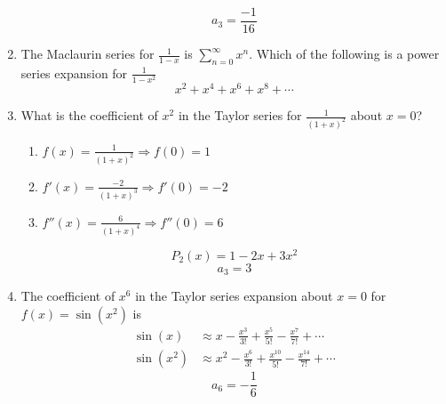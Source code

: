 \documentclass[12pt]{article}
\begin{document}
\begin{enumerate}
	      $$\boxed{a_{3} = \frac{-1}{16}}$$
	\item The Maclaurin series for $\frac{1}{1-x}$ is $\sum_{n=0}^{\infty} x^n$. Which of the following is a power series expansion for $\frac{1}{1-x^2}$
	      $$\boxed{x^2+x^4+x^6+x^8 +\cdots}$$
	\item What is the coefficient of $x^2$ in the Taylor series for $\frac{1}{(1+x)^2}$ about $x = 0$?
	      \begin{enumerate}
	      	\item $f(x) = \frac{1}{(1+x)^2} \Longrightarrow f(0) = 1$
	      	\item $f'(x) = \frac{-2}{(1+x)^3} \Longrightarrow f'(0) = -2$
	      	\item $f''(x) = \frac{6}{(1+x)^4} \Longrightarrow f''(0) = 6$
	      \end{enumerate}
	      $$P_{2}(x) = 1-2x+3x^2$$
	      $$\boxed{a_3 = 3}$$
	\item The coefficient of $x^6$ in the Taylor series expansion about $x=0$ for $f(x)=\sin(x^2)$ is
	      \begin{align*}
	      	\sin(x)   & \approx x - \frac{x^3}{3!} + \frac{x^5}{5!} - \frac{x^7}{7!} + \cdots         \\
	      	\sin(x^2) & \approx x^2 - \frac{x^6}{3!} + \frac{x^{10}}{5!} - \frac{x^{14}}{7!} + \cdots 
	      \end{align*}
	      $$\boxed{a_6 = -\frac{1}{6}}$$
\end{enumerate}
\end{document}
